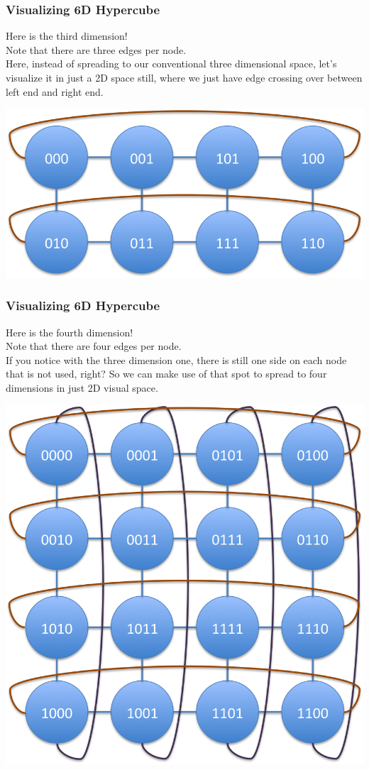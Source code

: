 \documentclass[9pt]{beamer}
\begin{document}
\begin{frame}[fragile]
  \frametitle{Visualizing 6D Hypercube}
Here is the third dimension!\\
Note that there are three edges per node.\\
Here, instead of spreading to our conventional three dimensional space, let's visualize it in just a 2D space still, where we just have edge crossing over between left end and right end.\\
\begin{center}
  \includegraphics[scale=.5]{3d_hypercube}
\end{center}
\end{frame}
\begin{frame}[fragile]
  \frametitle{Visualizing 6D Hypercube}
Here is the fourth dimension!\\
Note that there are four edges per node.\\
If you notice with the three dimension one, there is still one side on each node that is not used, right? So we can make use of that spot to spread to four dimensions in just 2D visual space.
\begin{center}
  \includegraphics[scale=.25]{4d_hypercube}
\end{center}
\end{frame}
\end{document}
